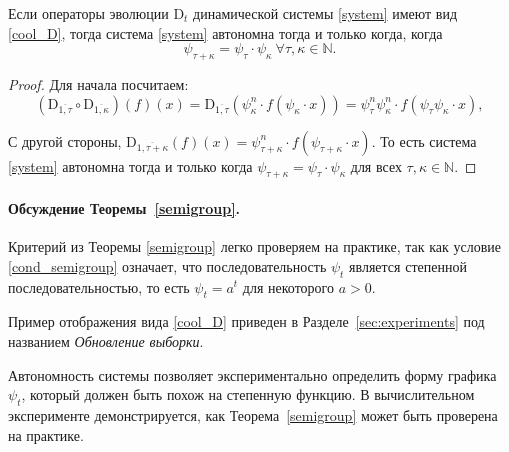         \begin{theorem} \label{semigroup}
            Если операторы эволюции $\text{D}_t$ динамической системы \eqref{system} имеют вид \eqref{cool_D}, тогда система \eqref{system} автономна тогда и только когда, когда
            \begin{equation} \label{cond_semigroup}
                \psi_{\tau + \kappa} = \psi_{\tau} \cdot \psi_{\kappa} ~\forall \tau, \kappa \in \mathbb{N}.
            \end{equation}
        \end{theorem}

        \begin{proof}
            Для начала посчитаем:
            \begin{equation*}
            (\text{D}_{\overline{1, \tau}} \circ \text{D}_{\overline{1, \kappa}})(f)(x) = \text{D}_{\overline{1, \tau}}(\psi_{\kappa}^n \cdot f(\psi_{\kappa} \cdot x)) = \psi_{\tau}^n\psi_{\kappa}^n \cdot f(\psi_{\tau}\psi_{\kappa} \cdot x),
            \end{equation*}

            С другой стороны,
            $
                \text{D}_{\overline{1, \tau + \kappa}}(f)(x) = \psi_{\tau + \kappa}^n \cdot f(\psi_{\tau + \kappa} \cdot x).
            $
            То есть система \eqref{system} автономна тогда и только когда $\psi_{\tau + \kappa} = \psi_{\tau} \cdot \psi_{\kappa}$ для всех $ \tau, \kappa \in \mathbb{N}$.
        \end{proof}
    
        \paragraph{Обсуждение Теоремы~\ref{semigroup}.} Критерий из Теоремы \ref{semigroup} легко проверяем на практике, так как условие \eqref{cond_semigroup} означает, что последовательность $\psi_t$ является степенной последовательностью, то есть $\psi_t = a^t$ для некоторого $a > 0$. 
    
        Пример отображения вида \eqref{cool_D} приведен в Разделе~\ref{sec:experiments} под названием \emph{Обновление выборки}.
    
        Автономность системы позволяет экспериментально определить форму графика $\psi_t$, который должен быть похож на степенную функцию. В вычислительном эксперименте демонстрируется, как Теорема~\ref{semigroup} может быть проверена на практике.
    
